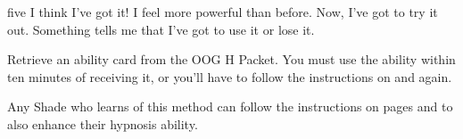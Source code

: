 \documentclass[notebook]{Silversiders} %
\begin{document}
\begin{page}{five}
I think I've got it! I feel more powerful than before. Now, I've got to try it out. Something tells me that I've got to use it or lose it.

Retrieve an ability card from the OOG H Packet. You must use the ability within ten minutes of receiving it, or you'll have to follow the instructions on  and  again.

Any Shade who learns of this method can follow the instructions on pages  and  to also enhance their hypnosis ability.
\end{page}

\endnotebook
\end{document}
